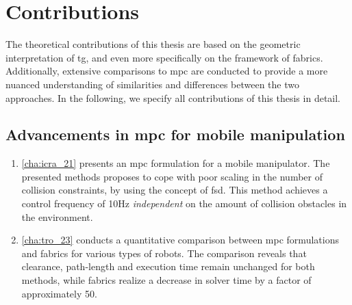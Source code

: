 \section{Contributions}
\label{sec:contributions}

The theoretical contributions of this thesis
are based on the geometric interpretation of \ac{tg}, and
even more specifically on the framework of \ac{fabrics}.
Additionally, extensive
comparisons to \ac{mpc} are conducted to
provide a more nuanced understanding of similarities and
differences between the two approaches. In the following, we
specify all contributions of this thesis in detail.


\subsection{Advancements in \ac{mpc} for mobile manipulation}
\begin{enumerate}
    \item \cref{cha:icra_21} presents an \ac{mpc} formulation for a
      mobile manipulator. The presented methods proposes to cope
      with poor scaling in the number of collision constraints, by
      using the concept of \ac{fsd}. This method achieves a
      control frequency of 10Hz \textit{independent} on the amount
      of collision obstacles in the environment.
    \item \cref{cha:tro_23} conducts a quantitative comparison between \ac{mpc}
      formulations and \ac{fabrics} for various types of
      robots. The comparison reveals that clearance,
      path-length and execution time remain unchanged for
      both methods, while \ac{fabrics} realize a decrease in
      solver time by a factor of approximately 50.
\end{enumerate}

